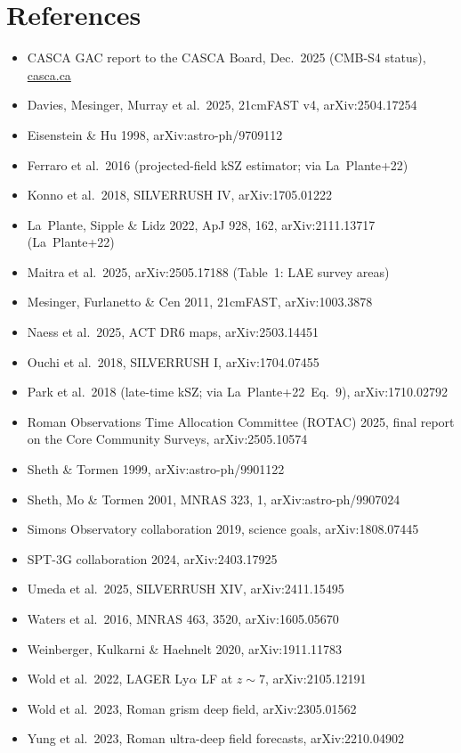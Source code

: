 \documentclass[11pt]{article}
\newcommand{\LP}{La~Plante+22}
\begin{document}
\section*{References}
\small
\begin{itemize}\setlength\itemsep{1pt}
\item CASCA GAC report to the CASCA Board, Dec.\ 2025 (CMB-S4 status), \href{https://casca.ca/wp-content/uploads/2026/03/GAC-Report-to-CASCA-Board-December-2025-2.pdf}{casca.ca}
\item Davies, Mesinger, Murray et al.\ 2025, 21cmFAST v4, arXiv:2504.17254
\item Eisenstein \& Hu 1998, arXiv:astro-ph/9709112
\item Ferraro et al.\ 2016 (projected-field kSZ estimator; via \LP)
\item Konno et al.\ 2018, SILVERRUSH IV, arXiv:1705.01222
\item La~Plante, Sipple \& Lidz 2022, ApJ 928, 162, arXiv:2111.13717 (\LP)
\item Maitra et al.\ 2025, arXiv:2505.17188 (Table~1: LAE survey areas)
\item Mesinger, Furlanetto \& Cen 2011, 21cmFAST, arXiv:1003.3878
\item Naess et al.\ 2025, ACT DR6 maps, arXiv:2503.14451
\item Ouchi et al.\ 2018, SILVERRUSH I, arXiv:1704.07455
\item Park et al.\ 2018 (late-time kSZ; via \LP\ Eq.~9), arXiv:1710.02792
\item Roman Observations Time Allocation Committee (ROTAC) 2025, final report on the Core Community Surveys, arXiv:2505.10574
\item Sheth \& Tormen 1999, arXiv:astro-ph/9901122
\item Sheth, Mo \& Tormen 2001, MNRAS 323, 1, arXiv:astro-ph/9907024
\item Simons Observatory collaboration 2019, science goals, arXiv:1808.07445
\item SPT-3G collaboration 2024, arXiv:2403.17925
\item Umeda et al.\ 2025, SILVERRUSH XIV, arXiv:2411.15495
\item Waters et al.\ 2016, MNRAS 463, 3520, arXiv:1605.05670
\item Weinberger, Kulkarni \& Haehnelt 2020, arXiv:1911.11783
\item Wold et al.\ 2022, LAGER Ly$\alpha$ LF at $z\sim7$, arXiv:2105.12191
\item Wold et al.\ 2023, Roman grism deep field, arXiv:2305.01562
\item Yung et al.\ 2023, Roman ultra-deep field forecasts, arXiv:2210.04902
\end{itemize}
\end{document}
